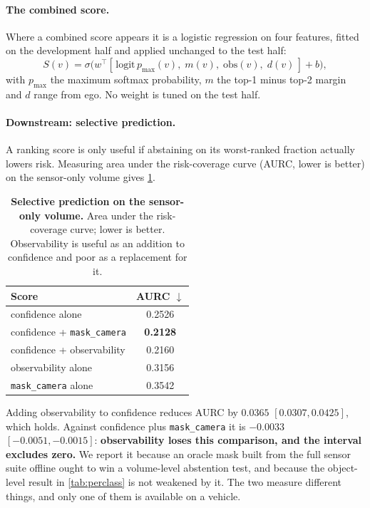 \documentclass[10pt,twocolumn,letterpaper]{article}
\begin{document}
\paragraph{The combined score.}
Where a combined score appears it is a logistic regression on four features,
fitted on the development half and applied unchanged to the test half:
\begin{equation}
S(v) = \sigma\!\big(w^{\!\top}
  [\,\mathrm{logit}\,p_{\max}(v),\; m(v),\; \mathrm{obs}(v),\; d(v)\,] + b\big),
\label{eq:combined}
\end{equation}
with $p_{\max}$ the maximum softmax probability, $m$ the top-1 minus top-2
margin and $d$ range from ego. No weight is tuned on the test half.

\paragraph{Downstream: selective prediction.}
A ranking score is only useful if abstaining on its worst-ranked fraction
actually lowers risk. Measuring area under the risk-coverage curve
(AURC, lower is better) on the sensor-only volume gives
\cref{tab:selective}.

\begin{table}[t]
\centering\small
\begin{tabular}{lc}
\toprule
Score & AURC $\downarrow$ \\
\midrule
confidence alone                & 0.2526 \\
confidence + \texttt{mask\_camera} & \textbf{0.2128} \\
confidence + observability      & 0.2160 \\
observability alone             & 0.3156 \\
\texttt{mask\_camera} alone     & 0.3542 \\
\bottomrule
\end{tabular}
\caption{\textbf{Selective prediction on the sensor-only volume.} Area under the risk-coverage curve; lower is better. Observability is useful as an addition to confidence and poor as a replacement for it.}
\label{tab:selective}
\end{table}

Adding observability to confidence reduces AURC by
$0.0365$ $[0.0307, 0.0425]$, which holds. Against
confidence plus \texttt{mask\_camera} it is $-0.0033$
$[-0.0051, -0.0015]$: \textbf{observability loses this comparison, and the
interval excludes zero.} We report it because an oracle mask built from the
full sensor suite offline ought to win a volume-level abstention test, and
because the object-level result in \cref{tab:perclass} is not weakened by
it. The two measure different things, and only one of them is available on
a vehicle.
\end{document}
